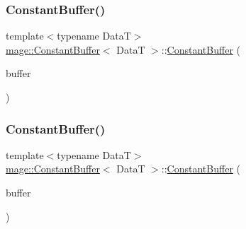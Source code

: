 \hypertarget{structmage_1_1_constant_buffer_a67fe42cb52e63e38474b6c65341fbe82}{}\label{structmage_1_1_constant_buffer_a67fe42cb52e63e38474b6c65341fbe82} 
\subsubsection{\texorpdfstring{Constant\+Buffer()}{ConstantBuffer()}\hspace{0.1cm}{\footnotesize\ttfamily [2/3]}}
{\footnotesize\ttfamily template$<$typename DataT$>$ \\
\hyperlink{structmage_1_1_constant_buffer}{mage\+::\+Constant\+Buffer}$<$ DataT $>$\+::\hyperlink{structmage_1_1_constant_buffer}{Constant\+Buffer} (\begin{DoxyParamCaption}\item[{const \hyperlink{structmage_1_1_constant_buffer}{Constant\+Buffer}$<$ DataT $>$ \&}]{buffer }\end{DoxyParamCaption})\hspace{0.3cm}{\ttfamily [delete]}}

\hypertarget{structmage_1_1_constant_buffer_a851570293d8eeb47f83749f8f54864ee}{}\label{structmage_1_1_constant_buffer_a851570293d8eeb47f83749f8f54864ee} 
\subsubsection{\texorpdfstring{Constant\+Buffer()}{ConstantBuffer()}\hspace{0.1cm}{\footnotesize\ttfamily [3/3]}}
{\footnotesize\ttfamily template$<$typename DataT$>$ \\
\hyperlink{structmage_1_1_constant_buffer}{mage\+::\+Constant\+Buffer}$<$ DataT $>$\+::\hyperlink{structmage_1_1_constant_buffer}{Constant\+Buffer} (\begin{DoxyParamCaption}\item[{\hyperlink{structmage_1_1_constant_buffer}{Constant\+Buffer}$<$ DataT $>$ \&\&}]{buffer }\end{DoxyParamCaption})\hspace{0.3cm}{\ttfamily [default]}}

\hypertarget{structmage_1_1_constant_buffer_a874e9507ea3b6d2f630f061c2fc6d2d0}{}\label{structmage_1_1_constant_buffer_a874e9507ea3b6d2f630f061c2fc6d2d0} 
